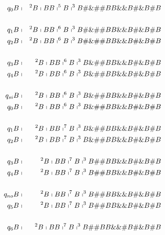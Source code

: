 \begin{frame}

  \begin{eqnarray*}
  q_{0}B &\shortmid &^{2}B\shortmid BB\shortmid ^{5}B\shortmid
  ^{3}B\#\&\#\#BB\&\&B\#\&B\#B \\
  && \\
  q_{1}B &\shortmid &^{2}B\shortmid BB\shortmid ^{6}B\shortmid
  ^{3}B\#\&\#\#BB\&\&B\#\&B\#B \\
  q_{2}B &\shortmid &^{2}B\shortmid BB\shortmid ^{6}B\shortmid
  ^{3}B\#\&\#\#BB\&\&B\#\&B\#B \\
  && \\
  q_{3}B &\shortmid &^{2}B\shortmid BB\shortmid ^{6}B\shortmid
  ^{3}B\&\#\#BB\&\&B\#\&B\#B \\
  q_{4}B &\shortmid &^{2}B\shortmid BB\shortmid ^{6}B\shortmid
  ^{3}B\&\#\#BB\&\&B\#\&B\#B \\
  && \\
  q_{si}B &\shortmid &^{2}B\shortmid BB\shortmid ^{6}B\shortmid
  ^{3}B\&\#\#BB\&\&B\#\&B\#B \\
  q_{0}B &\shortmid &^{2}B\shortmid BB\shortmid ^{6}B\shortmid
  ^{3}B\&\#\#BB\&\&B\#\&B\#B \\
  && \\
  q_{1}B &\shortmid &^{2}B\shortmid BB\shortmid ^{7}B\shortmid
  ^{3}B\&\#\#BB\&\&B\#\&B\#B \\
  q_{2}B &\shortmid &^{2}B\shortmid BB\shortmid ^{7}B\shortmid
  ^{3}B\&\#\#BB\&\&B\#\&B\#B \\
  && \\
  q_{3}B &\shortmid &^{2}B\shortmid BB\shortmid ^{7}B\shortmid
  ^{3}B\#\#BB\&\&B\#\&B\#B \\
  q_{4}B &\shortmid &^{2}B\shortmid BB\shortmid ^{7}B\shortmid
  ^{3}B\#\#BB\&\&B\#\&B\#B \\
  && \\
  q_{no}B &\shortmid &^{2}B\shortmid BB\shortmid ^{7}B\shortmid
  ^{3}B\#\#BB\&\&B\#\&B\#B \\
  q_{5}B &\shortmid &^{2}B\shortmid BB\shortmid ^{7}B\shortmid
  ^{3}B\#\#BB\&\&B\#\&B\#B \\
  && \\
  q_{6}B &\shortmid &^{2}B\shortmid BB\shortmid ^{7}B\shortmid
  ^{3}B\#\#BB\&\&\#B\#\&B\#B
  \end{eqnarray*}


\end{frame}

